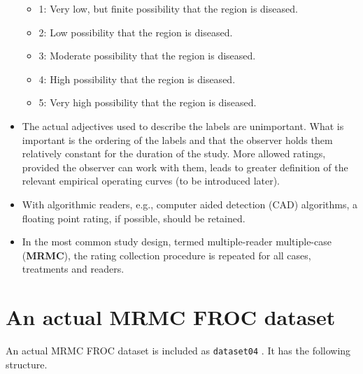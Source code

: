 \documentclass[]{book}
\newenvironment{Shaded}{\begin{snugshade}}{\end{snugshade}}
\newcommand{\CommentTok}[1]{\textcolor[rgb]{0.56,0.35,0.01}{\textit{#1}}}
\newcommand{\KeywordTok}[1]{\textcolor[rgb]{0.13,0.29,0.53}{\textbf{#1}}}
\newcommand{\NormalTok}[1]{#1}
\providecommand{\tightlist}{%
  \setlength{\itemsep}{0pt}\setlength{\parskip}{0pt}}
\begin{document}
\begin{itemize}
  \begin{itemize}
  \tightlist
  \item
    1: Very low, but finite possibility that the region is diseased.
  \item
    2: Low possibility that the region is diseased.
  \item
    3: Moderate possibility that the region is diseased.
  \item
    4: High possibility that the region is diseased.
  \item
    5: Very high possibility that the region is diseased.
  \end{itemize}
\item
  The actual adjectives used to describe the labels are unimportant. What is important is the ordering of the labels and that the observer holds them relatively constant for the duration of the study. More allowed ratings, provided the observer can work with them, leads to greater definition of the relevant empirical operating curves (to be introduced later).
\item
  With algorithmic readers, e.g., computer aided detection (CAD) algorithms, a floating point rating, if possible, should be retained.
\item
  In the most common study design, termed multiple-reader multiple-case (\textbf{MRMC}), the rating collection procedure is repeated for all cases, treatments and readers.
\end{itemize}

\hypertarget{an-actual-mrmc-froc-dataset}{%
\section{An actual MRMC FROC dataset}\label{an-actual-mrmc-froc-dataset}}

An actual MRMC FROC dataset is included as \texttt{dataset04} \citep{RN1882}. It has the following structure.

\begin{Shaded}
\end{Shaded}
\end{document}
